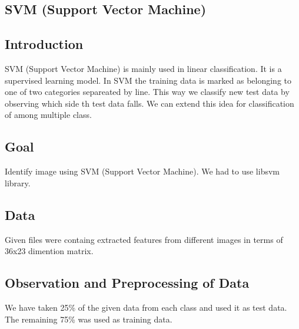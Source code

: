 \begin{center}
\section{SVM (Support Vector Machine)}
\end{center}

\subsection{Introduction}
\begin{flushleft}
  SVM (Support Vector Machine) is mainly used in linear classification. It is a supervised learning model.
  In SVM the training data is marked as belonging to one of two categories separeated by line. This way we 
  classify new test data by observing which side th test data falls. \break
  We can extend this idea for classification of among multiple class. 
\end{flushleft}

\subsection{Goal}
\begin{flushleft}
    Identify image using SVM (Support Vector Machine). We had to use libsvm library.
\end{flushleft}

\subsection{Data}
\begin{flushleft}
    Given files were containg extracted features from different images in terms of 36x23 dimention matrix.
\end{flushleft}

\subsection{Observation and Preprocessing of Data}
\begin{flushleft}
  We have taken 25\% of the given data from each class and used it as test data.
  The remaining 75\% was used as training data.
\end{flushleft}


